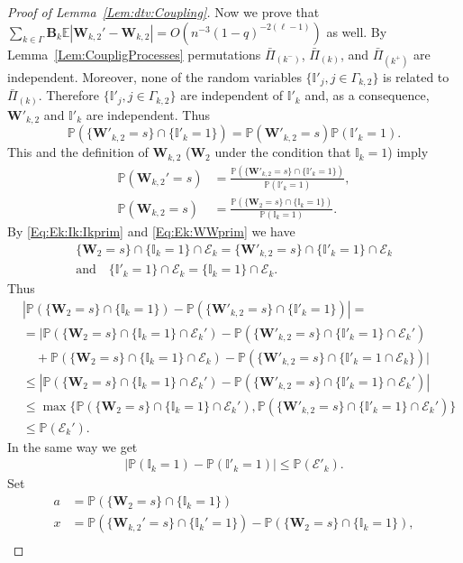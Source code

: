 \documentclass[letterpaper,11pt]{article}
\theoremstyle{definition}
\theoremstyle{remark}
\renewcommand{\le}{\leqslant}
\newcommand{\bE}{\mathbb{E}}
\newcommand{\Pra}[1]{\mathbb{P}\left(#1\right)}
\newcommand{\bB}{\mathbf{B}}
\newcommand{\Ind}{\mathbb{I}}
\newcommand{\barpi}{\bar \varPi}
\newcommand{\cE}{\mathcal{E}}
\newcommand{\bW}{\mathbf{W}}
\begin{document}
\begin{proof}[Proof of Lemma~\ref{Lem:dtv:Coupling}]
	Now we prove that $\sum_{k\in \Gamma}\bB_k\bE|\bW_{k,2}'-\bW_{k,2}|= O(n^{-3}(1-q)^{-2(\ell-1)})$ as well. By Lemma~\ref{Lem:CoupligProcesses} permutations $\barpi_{(k^-)}$, $\barpi_{(k)}$, and $\barpi_{(k^+)}$  are independent. Moreover, none of the random variables $\{\Ind'_j, j\in \Gamma_{k,2}\}$  is related to $\barpi_{(k)}$. Therefore $\{\Ind'_j,j\in \Gamma_{k,2}\}$ are independent of $\Ind'_k$ and, as a consequence, $\bW'_{k,2}$ and $\Ind'_k$ are independent. Thus \[\Pra{\{\bW'_{k,2}=s\}\cap\{\Ind'_k=1\}}=\Pra{\bW'_{k,2}=s}\Pra{\Ind'_k=1}.\]
	This and the definition of $\bW_{k,2}$ ($\bW_2$ under the condition that $\Ind_k=1$) imply
	\[
	\begin{split}
		\Pra{\bW_{k,2}'=s}&=\frac{\Pra{\{\bW'_{k,2}=s\}\cap\{\Ind'_k=1\}}}{\Pra{\Ind'_k=1}},\\
		\Pra{\bW_{k,2}=s}&=\frac{\Pra{\{\bW_{2}=s\}\cap\{\Ind_k=1\}}}{\Pra{\Ind_k=1}}.
	\end{split}
	\]
	By \eqref{Eq:Ek:Ik:Ikprim} and \eqref{Eq:Ek:WWprim} we have
	\begin{multline*}
		\{\bW_{2}=s\}\cap\{\Ind_k=1\}\cap\cE_k=\{\bW'_{k,2}=s\}\cap\{\Ind'_k=1\}\cap\cE_k
		\\ \text{and}
		\quad
		\{\Ind'_k=1\}\cap \cE_k = \{\Ind_k=1\}\cap \cE_k. 
	\end{multline*}
	Thus 
	\begin{align*}
		&|\Pra{\{\bW_{2}=s\}\cap\{\Ind_k=1\}}-\Pra{\{\bW'_{k,2}=s\}\cap\{\Ind'_k=1\}}|=\\
		&=|\Pra{\{\bW_{2}=s\}\cap\{\Ind_k=1\}\cap\cE_k'}-\Pra{\{\bW'_{k,2}=s\}\cap\{\Ind'_k=1\}\cap\cE_k'}\\
		&\quad+\Pra{\{\bW_{2}=s\}\cap\{\Ind_k=1\}\cap\cE_k}-\Pra{\{\bW'_{k,2}=s\}\cap\{\Ind'_k=1\cap\cE_k\}}|\\
		&\le |\Pra{\{\bW_{2}=s\}\cap\{\Ind_k=1\}\cap\cE_k'}-\Pra{\{\bW'_{k,2}=s\}\cap\{\Ind'_k=1\}\cap\cE_k'}|\\
		&\le 
		\max\{\Pra{\{\bW_{2}=s\}\cap\{\Ind_k=1\}\cap\cE_k'},\Pra{\{\bW'_{k,2}=s\}\cap\{\Ind'_k=1\}\cap\cE_k'}\}\\
		&\le \Pra{\cE_k'}.
	\end{align*}
	In the same way we get
	\begin{align*}
		|\Pra{\Ind_k=1}-\Pra{\Ind'_k=1}|\le \Pra{\cE'_k}.
	\end{align*}
	Set
	\begin{align*}
		a&=\Pra{\{\bW_{2}=s\}\cap\{\Ind_k=1\}}\\
		x&=\Pra{\{\bW_{k,2}'=s\}\cap\{\Ind_k'=1\}}-\Pra{\{\bW_{2}=s\}\cap\{\Ind_k=1\}},\\	

\end{align*}
\end{proof}
\end{document}
